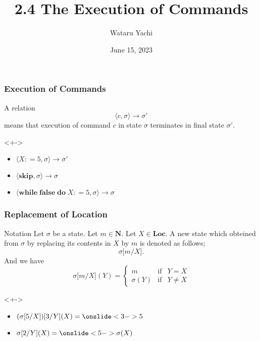 \documentclass[12pt,aspectratio=169]{beamer}
\title{ 2.4 The Execution of Commands}
\author{Wataru Yachi}
\institute{JAIST}
\date{June 15, 2023}
\def\coloneqq{\mathrel{\mathop:}=}%
\newcommand{\cpair}[1]{\langle #1 \rangle}
\newcommand{\while}[2]{\mathbf{while}\; #1 \; \mathbf{do}\; #2}
\begin{document}
\maketitle

\begin{frame}
    \frametitle{Execution of Commands}
    \begin{definition}
        A relation
        \[
            \langle c, \sigma \rangle \rightarrow \sigma'
        \]
        means that execution of command $c$ in state $\sigma$ terminates in final state $\sigma'$.
    \end{definition}


    \begin{example}<+->
        \begin{itemize}[<+->]
            \item $\langle X \coloneqq 5, \sigma \rangle \rightarrow \sigma'$
            \item $\cpair{\mathbf{skip}, \sigma} \to \sigma$
            \item $\cpair{\while{\mathbf{false}}{X \coloneqq 5}, \sigma} \to \sigma$
        \end{itemize}
    \end{example}
\end{frame}

\begin{frame}
    \frametitle{Replacement of Location}

    \begin{block}{Notation}
        Let $\sigma$ be a state. Let $m \in \mathbf{N}$. Let $X \in \mathbf{Loc}$.
        A new state which obteined from $\sigma$ by replacing its contents in $X$ by $m$ is denoted as follows;
        \[ \sigma \lbrack m / X \rbrack. \]
        And we have
        \[
            \sigma \lbrack m/X \rbrack (Y) = \left\{ \begin{array}{lcl}
                m & \mathrm{if} & Y = X\\
                \sigma(Y) & \mathrm{if} & Y \neq X
            \end{array} \right.
        \]
    \end{block}

    \begin{example}[Quiz]<+->
        \begin{itemize}[<+->]
            \item $(\sigma[5/X])[3/Y](X) = \onslide<3->{5}$ 
            \pause
            \item $\sigma[2/Y](X) = \onslide<5->{\sigma(X)}$ 
        \end{itemize}
    \end{example}
\end{frame}
\end{document}
